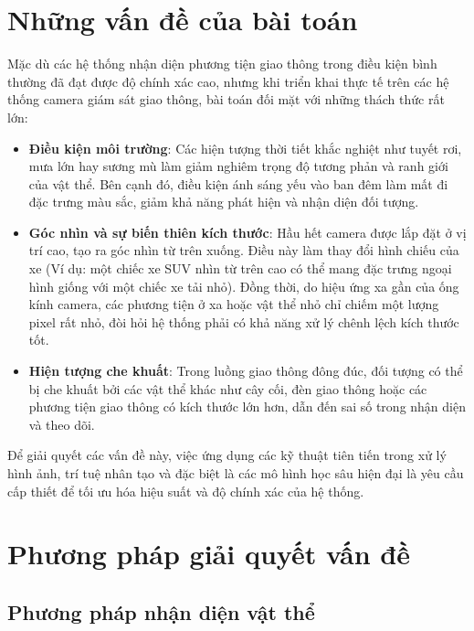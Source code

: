 
\section{Những vấn đề của bài toán}

Mặc dù các hệ thống nhận diện phương tiện giao thông trong điều kiện bình thường đã đạt được độ chính xác cao, nhưng khi triển khai thực tế trên các hệ thống camera giám sát giao thông, bài toán đối mặt với những thách thức rất lớn:
\begin{itemize}
	\item \textbf{Điều kiện môi trường}: Các hiện tượng thời tiết khắc nghiệt như tuyết rơi, mưa lớn hay sương mù làm giảm nghiêm trọng độ tương phản và ranh giới của vật thể. Bên cạnh đó, điều kiện ánh sáng yếu vào ban đêm làm mất đi đặc trưng màu sắc, giảm khả năng phát hiện và nhận diện đối tượng.
	
	\item \textbf{Góc nhìn và sự biến thiên kích thước}: Hầu hết camera được lắp đặt ở vị trí cao, tạo ra góc nhìn từ trên xuống. Điều này làm thay đổi hình chiếu của xe (Ví dụ: một chiếc xe SUV nhìn từ trên cao có thể mang đặc trưng ngoại hình giống với một chiếc xe tải nhỏ). Đồng thời, do hiệu ứng xa gần của ống kính camera, các phương tiện ở xa hoặc vật thể nhỏ chỉ chiếm một lượng pixel rất nhỏ, đòi hỏi hệ thống phải có khả năng xử lý chênh lệch kích thước tốt.
	
	\item \textbf{Hiện tượng che khuất}: Trong luồng giao thông đông đúc, đối tượng có thể bị che khuất bởi các vật thể khác như cây cối, đèn giao thông hoặc các phương tiện giao thông có kích thước lớn hơn, dẫn đến sai số trong nhận diện và theo dõi.
\end{itemize}

Để giải quyết các vấn đề này, việc ứng dụng các kỹ thuật tiên tiến trong xử lý hình ảnh, trí tuệ nhân tạo và đặc biệt là các mô hình học sâu hiện đại là yêu cầu cấp thiết để tối ưu hóa hiệu suất và độ chính xác của hệ thống.

\section{Phương pháp giải quyết vấn đề}

\subsection{Phương pháp nhận diện vật thể}

